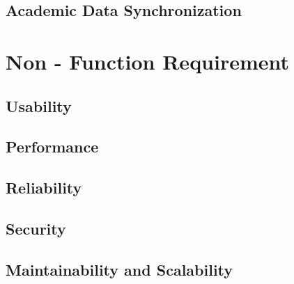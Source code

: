 \subsection{Academic Data Synchronization}


\section{Non - Function Requirement}
\subsection{Usability}

\subsection{Performance}

\subsection{Reliability}

\subsection{Security}

\subsection{Maintainability and Scalability}